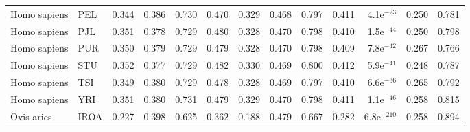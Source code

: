 \begin{longtable}{llrrrrrrrrrrr}
        Homo sapiens &                       PEL &                              0.344 &                               0.386 &                 0.730 &                 0.470 &                              0.329 &                               0.468 &                 0.797 &                 0.411 &  4.1e$^{-23}$ &  0.250 &  0.781 \\
        Homo sapiens &                       PJL &                              0.351 &                               0.378 &                 0.729 &                 0.480 &                              0.328 &                               0.470 &                 0.798 &                 0.410 &  1.5e$^{-44}$ &  0.250 &  0.798 \\
        Homo sapiens &                       PUR &                              0.350 &                               0.379 &                 0.729 &                 0.479 &                              0.328 &                               0.470 &                 0.798 &                 0.409 &  7.8e$^{-42}$ &  0.267 &  0.766 \\
        Homo sapiens &                       STU &                              0.352 &                               0.377 &                 0.729 &                 0.482 &                              0.330 &                               0.469 &                 0.800 &                 0.412 &  5.9e$^{-41}$ &  0.248 &  0.787 \\
        Homo sapiens &                       TSI &                              0.349 &                               0.380 &                 0.729 &                 0.478 &                              0.328 &                               0.469 &                 0.797 &                 0.410 &  6.6e$^{-36}$ &  0.265 &  0.792 \\
        Homo sapiens &                       YRI &                              0.351 &                               0.380 &                 0.731 &                 0.479 &                              0.329 &                               0.470 &                 0.798 &                 0.411 &  1.1e$^{-46}$ &  0.258 &  0.815 \\
          Ovis aries &                      IROA &                              0.227 &                               0.398 &                 0.625 &                 0.362 &                              0.188 &                               0.479 &                 0.667 &                 0.282 & 6.8e$^{-210}$ &  0.258 &  0.894 \\

\end{longtable}
